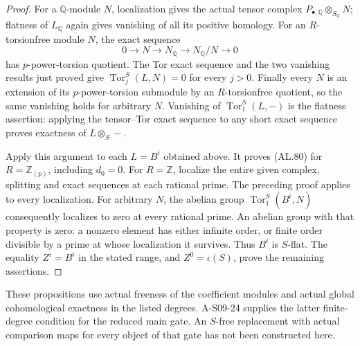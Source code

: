 \begin{proof}
For a $\mathbb Q$-module $N$, localization gives the
actual tensor complex
$P_{\bullet,\mathbb Q}\otimes_{S_{\mathbb Q}}N$;
flatness of $L_{\mathbb Q}$ again gives vanishing of
all its positive homology. For an $R$-torsionfree
module $N$, the exact sequence
\[
 0\longrightarrow N\longrightarrow N_{\mathbb Q}
       \longrightarrow N_{\mathbb Q}/N\longrightarrow0
 \tag{AL.83}
\]
has $p$-power-torsion quotient. The Tor exact sequence
and the two vanishing results just proved give
$\operatorname{Tor}^S_j(L,N)=0$ for every $j>0$.
Finally every $N$ is an extension of its
$p$-power-torsion submodule by an $R$-torsionfree
quotient, so the same vanishing holds for arbitrary
$N$. Vanishing of $\operatorname{Tor}^S_1(L,-)$ is
the flatness assertion: applying the tensor--Tor exact
sequence to any short exact sequence proves exactness
of $L\otimes_S-$.

Apply this argument to each $L=B^i$ obtained above.
It proves (AL.80) for $R=\mathbb Z_{(p)}$, including
$d_0=0$. For $R=\mathbb Z$, localize the entire given
complex, splitting and exact sequences at each rational
prime. The preceding proof applies to every localization.
For arbitrary $N$, the abelian group
$\operatorname{Tor}^S_1(B^i,N)$ consequently localizes
to zero at every rational prime. An abelian group with
that property is zero: a nonzero element has either
infinite order, or finite order divisible by a prime
at whose localization it survives. Thus $B^i$ is
$S$-flat. The equality $Z^i=B^i$ in the stated range,
and $Z^0=\iota(S)$, prove the remaining assertions.
\end{proof}

These propositions use actual freeness of the coefficient
modules and actual global cohomological exactness in the
listed degrees. A-S09-24 supplies the latter finite-degree
condition for the reduced main gate. An $S$-free replacement
with actual comparison maps for every object of that gate
has not been constructed here.
